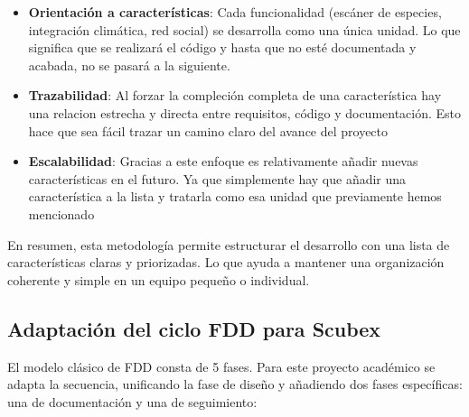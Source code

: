 \begin{itemize}
    \item \textbf{Orientación a características}: Cada funcionalidad (escáner de especies, integración climática, red social) se desarrolla como una única unidad. Lo que significa que se realizará el código y hasta que no esté documentada y acabada, no se pasará a la siguiente.
    \item \textbf{Trazabilidad}: Al forzar la compleción completa de una característica hay una relacion estrecha y directa entre requisitos, código y documentación. Esto hace que sea fácil trazar un camino claro del avance del proyecto
    \item \textbf{Escalabilidad}: Gracias a este enfoque es relativamente añadir nuevas características en el futuro. Ya que simplemente hay que añadir una característica a la lista y tratarla como esa unidad que previamente hemos mencionado
\end{itemize}

En resumen, esta metodología permite estructurar el desarrollo con una lista de características claras y priorizadas. Lo que ayuda a mantener una organización coherente y simple en un equipo pequeño o individual.
\subsection{Adaptación del ciclo FDD para Scubex}

El modelo clásico de FDD consta de 5 fases. Para este proyecto académico se adapta la secuencia, unificando la fase de diseño y añadiendo dos fases específicas: una de documentación y una de seguimiento:

